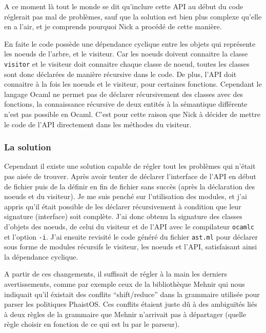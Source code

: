 A ce moment là tout le monde se dit qu'inclure cette API au début du code 
réglerait pas mal de problèmes, sauf que la solution est bien plus complexe 
qu'elle en a l'air, et je comprends pourquoi Nick a procédé de cette manière.

En faite le code possède une dépendance cyclique entre les objets qui 
représente les noeuds de l'arbre, et le visiteur. Car les noeuds doivent 
connaitre la classe \texttt{visitor} et le visiteur doit connaitre chaque 
classe de noeud, toutes les classes sont donc déclarées de manière récursive 
dans le code. De plus, l'API doit connaitre à la fois les noeuds et le 
visiteur, pour certaines fonctions. Cependant le langage Ocaml ne permet pas de 
déclarer récursivement des classes avec des fonctions, la connaissance 
récursive de deux entités à la sémantique différente n'est pas possible en 
Ocaml. C'est pour cette raison que Nick à décider de mettre le code de l'API 
directement dans les méthodes du visiteur.

\subsubsection{La solution}

Cependant il existe une solution capable de régler tout les problèmes qui 
n'était pas aisée de trouver. Après avoir tenter de déclarer l'interface de 
l'API en début de fichier puis de la définir en fin de fichier sans succès 
(après la déclaration des noeuds et du visiteur). Je me suis penché sur 
l'utilisation des modules, et j'ai appris qu'il était possible de les déclarer 
récursivement à condition que leur signature (interface) soit complète. J'ai 
donc obtenu la signature des classes d'objets des noeuds, de celui du visiteur 
et de l'API avec le compilateur \texttt{ocamlc} et l'option \texttt{-i}. J'ai 
ensuite revisité le code généré du fichier \texttt{ast.ml} pour déclarer sous 
forme de modules récursifs le visiteur, les noeuds et l'API, satisfaisant ainsi 
la dépendance cyclique.

A partir de ces changements, il suffisait de régler à la main les derniers 
avertissements, comme par exemple ceux de la bibliothèque Mehnir qui nous 
indiquait qu'il éxistait des conflits ``shift/reduce'' dans la grammaire 
utilisée pour parser les politiques PhaistOS. Ces conflits étaient juste dû à 
des ambiguïtés liés à deux règles de la grammaire que Mehnir n'arrivait pas à 
départager (quelle règle choisir en fonction de ce qui est lu par le parseur). 

